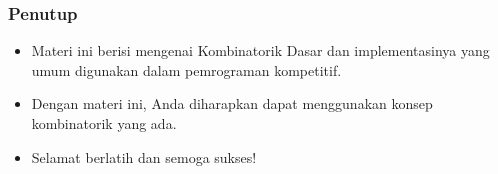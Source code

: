 \begin{frame}
\frametitle{Penutup}
\begin{itemize}
  \item Materi ini berisi mengenai Kombinatorik Dasar dan implementasinya yang umum digunakan dalam pemrograman kompetitif.
  \item Dengan materi ini, Anda diharapkan dapat menggunakan konsep kombinatorik yang ada.
  \item Selamat berlatih dan semoga sukses!
\end{itemize}
\end{frame}


